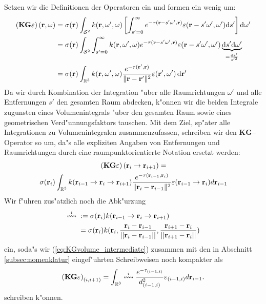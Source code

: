 	Setzen wir die Definitionen der Operatoren ein und formen ein wenig um:
	\begin{align*}
		\left(\mathbf{KG}\varepsilon\right)(\mathbf{r},\omega)&=\sigma(\mathbf{r}) \int_{\mathcal{S}^2} k(\mathbf{r},\omega',\omega)\left[\int_{s'=0}^\infty e^{-\tau(\mathbf{r}-s' \omega',\mathbf{r})}\varepsilon(\mathbf{r}-s' \omega',\omega') \text{d}s'\right] \text{d}\omega' \\
		&=\sigma(\mathbf{r}) \int_{\mathcal{S}^2} \int_{s'=0}^\infty k(\mathbf{r},\omega',\omega) e^{-\tau(\mathbf{r}-s' \omega',\mathbf{r})}\varepsilon(\mathbf{r}-s' \omega',\omega') \underbrace{\text{d}s' \text{d}\omega'}_{=\frac{\text{d}\mathbf{r}'}{s'^2}} \\
		&=\sigma(\mathbf{r}) \int_{\mathbb{R}^3} k(\mathbf{r},\omega',\omega) \frac{e^{-\tau(\mathbf{r}',\mathbf{r})}}{\|\mathbf{r}-\mathbf{r}'\|^2}\varepsilon(\mathbf{r}',\omega') \,\text{d}\mathbf{r}'
	\end{align*}
	Da wir durch Kombination der Integration "uber alle Raumrichtungen $\omega'$ und alle Entfernungen $s'$ den gesamten Raum abdecken, k"onnen wir die beiden Integrale zugunsten eines Volumenintegrals "uber den gesamten Raum sowie eines geometrischen Verd"unnungsfaktors tauschen. Mit dem Ziel, sp"ater alle Integrationen zu Volumenintegralen zusammenzufassen, schreiben wir den $\mathbf{KG}$--Operator so um, da"s alle expliziten Angaben von Entfernungen und Raumrichtungen durch eine raumpunktorientierte Notation ersetzt werden:
	\begin{multline}
		\left(\mathbf{KG}\varepsilon\right)(\mathbf{r}_i \rightarrow\mathbf{r}_{i+1})=\\
		\sigma(\mathbf{r}_i) \int_{\mathbb{R}^3} k(\mathbf{r}_{i-1}\rightarrow\mathbf{r}_i\rightarrow\mathbf{r}_{i+1})\frac{e^{-\tau(\mathbf{r}_{i-1},\mathbf{r}_i)}}{\|\mathbf{r}_i-\mathbf{r}_{i-1}\|^2}\varepsilon(\mathbf{r}_{i-1} \rightarrow\mathbf{r}_i)d\mathbf{r}_{i-1}
		\label{eq:KGvolume_intermediate}
	\end{multline}
	Wir f"uhren zus"atzlich noch die Abk"urzung
	\begin{align*}
		\overset{i}{\leftrightsquigarrow}\;&:=\sigma(\mathbf{r}_i)k(\mathbf{r}_{i-1}\rightarrow\mathbf{r}_i\rightarrow\mathbf{r}_{i+1})\\
			&=\sigma(\mathbf{r}_i)k(\mathbf{r}_i,\frac{\mathbf{r}_i-\mathbf{r}_{i-1}}{||\mathbf{r}_i-\mathbf{r}_{i-1}||},\frac{\mathbf{r}_{i+1}-\mathbf{r}_i}{||\mathbf{r}_{i+1}-\mathbf{r}_i||})
	\end{align*}
	ein, soda"s wir (\ref{eq:KGvolume_intermediate}) zusammen mit den in Abschnitt \ref{subsec:nomenklatur} eingef"uhrten Schreibweisen noch kompakter als
	\begin{equation}
		\left(\mathbf{KG}\varepsilon\right)_{(i,i+1)}=\int_{\mathbb{R}^3} \overset{i}{\leftrightsquigarrow}\frac{e^{-\tau_{(i-1,i)}}}{d_{(i-1,i)}^2}\varepsilon_{(i-1,i)}d\mathbf{r}_{i-1}.
		\label{eq:KGvolume}
	\end{equation}
	schreiben k"onnen.


